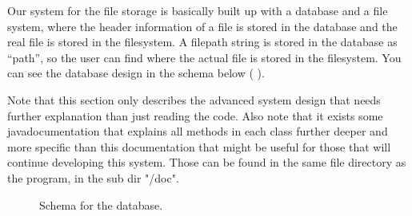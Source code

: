 Our system for the file storage is basically built up with a database and a file system, where the header information of a file is stored in the database and the real file is stored in the filesystem. A filepath string is stored in the database as “path”, so the user can find where the actual file is stored in the filesystem. You can see the database design in the schema below ( ). 

Note that this section only describes the advanced system design that needs further explanation than just reading the code. Also note that it exists some javadocumentation that explains all methods in each class further deeper and more specific than this documentation that might be useful for those that will continue developing this system. Those can be found in the same file directory as the program, in the sub dir "/doc".

\begin{figure}[htb]
\caption{Schema for the database.}
\label{fig:dat_databaseSchema}
\end{figure}

\FloatBarrier

